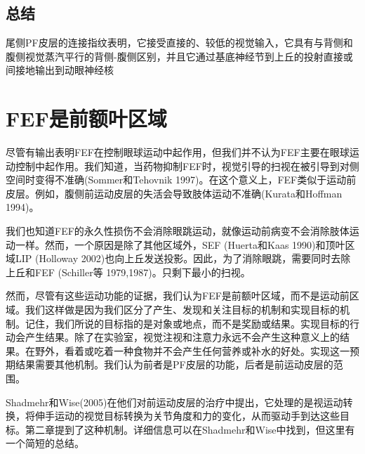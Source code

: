 \subsection{总结}
尾侧PF皮层的连接指纹表明，它接受直接的、较低的视觉输入，它具有与背侧和腹侧视觉蒸汽平行的背侧-腹侧区别，并且它通过基底神经节到上丘的投射直接或间接地输出到动眼神经核

\section{FEF是前额叶区域}
尽管有输出表明FEF在控制眼球运动中起作用，但我们并不认为FEF主要在眼球运动控制中起作用。我们知道，当药物抑制FEF时，视觉引导的扫视在被引导到对侧空间时变得不准确(Sommer和Tehovnik 1997)。在这个意义上，FEF类似于运动前皮层。例如，腹侧前运动皮层的失活会导致肢体运动不准确(Kurata和Hoffman 1994)。

我们也知道FEF的永久性损伤不会消除眼跳运动，就像运动前病变不会消除肢体运动一样。然而，一个原因是除了其他区域外，SEF (Huerta和Kaas 1990)和顶叶区域LIP (Holloway 2002)也向上丘发送投影。因此，为了消除眼跳，需要同时去除上丘和FEF (Schiller等 1979,1987)。只剩下最小的扫视。

然而，尽管有这些运动功能的证据，我们认为FEF是前额叶区域，而不是运动前区域。我们这样做是因为我们区分了产生、发现和关注目标的机制和实现目标的机制。记住，我们所说的目标指的是对象或地点，而不是奖励或结果。实现目标的行动会产生结果。除了在实验室，视觉注视和注意力永远不会产生这种意义上的结果。在野外，看着或吃着一种食物并不会产生任何营养或补水的好处。实现这一预期结果需要其他机制。我们认为前者是PF皮层的功能，后者是前运动皮层的范围。

Shadmehr和Wise(2005)在他们对前运动皮层的治疗中提出，它处理的是视运动转换，将伸手运动的视觉目标转换为关节角度和力的变化，从而驱动手到达这些目标。第二章提到了这种机制。详细信息可以在Shadmehr和Wise中找到，但这里有一个简短的总结。

